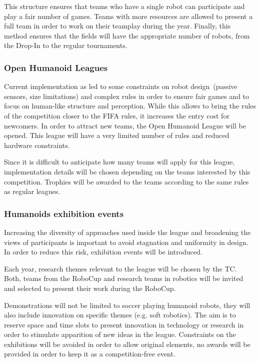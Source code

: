 \documentclass{article}
\begin{document}
This structure ensures that teams who have a single robot can participate and
play a fair number of games.
Teams with more resources are allowed to present a full team in order to work
on their teamplay during the year.
Finally, this method ensures that the fields will have the appropriate number
of robots, from the Drop-In to the regular tournaments.

\subsubsection{Open Humanoid Leagues}

Current implementation as led to some constraints on robot design~(passive
sensors, size limitations) and complex rules in order to ensure fair games and
to focus on human-like structure and perception.
While this allows to bring the rules of the competition closer to the FIFA rules,
it increases the entry cost for newcomers.
In order to attract new teams, the Open Humanoid League will be opened.
This league will have a very limited number of rules and reduced hardware constraints.

Since it is difficult to anticipate how many teams will apply for this league,
implementation details will be chosen depending on the teams interested by this
competition.
Trophies will be awarded to the teams according to the same rules as regular leagues.

\subsubsection{Humanoids exhibition events}

Increasing the diversity of approaches used inside the league and broadening the
views of participants is important to avoid stagnation and uniformity in design.
In order to reduce this risk, exhibition events will be introduced.

Each year, research themes relevant to the league will be chosen by the TC.
Both, teams from the RoboCup and research teams in robotics will be
invited and selected to present their work during the RoboCup.

Demonstrations will not be limited to soccer playing humanoid robots, they will
also include innovation on specific themes (e.g. soft robotics).
The aim is to reserve space and time slots to present innovation in technology
or research in order to stimulate apparition of new ideas in the league.
Constraints on the exhibitions will be avoided in order to allow original
elements, no awards will be provided in order to keep it as a competition-free
event.
\end{document}

